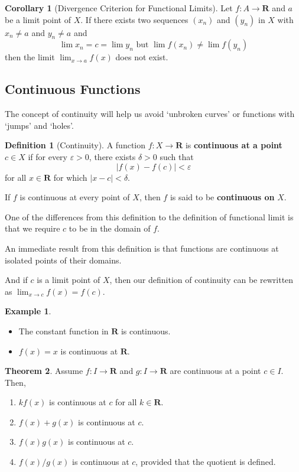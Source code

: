 \documentclass[tikz,12pt,a4paper]{article}
\theoremstyle{definition}
\newtheorem{theorem}{Theorem}[section]
\newtheorem{corollary}[theorem]{Corollary}
\newtheorem{example}{Example}[section]
\newtheorem{definition}{Definition}[section]
\begin{document}
\begin{corollary}[Divergence Criterion for Functional Limits]
	Let $f : A \longrightarrow \textbf{R}$ and $a$ be a limit point of $X$. If there exists two sequences $(x_n)$ and $(y_n)$ in $X$ with $x_n \neq a$ and $y_n \neq a$ and
	\[
		\lim x_n = c = \lim y_n \text{ but } \lim f(x_n) \neq \lim f(y_n)
	\]
	then the limit $ \lim_{x \to a} f(x)$ does not exist.
\end{corollary}

\subsection{Continuous Functions}

The concept of continuity will help us avoid `unbroken curves' or functions with `jumps' and `holes'.

\begin{definition}[Continuity]
	A function $f : X \longrightarrow \textbf{R}$ is \textbf{continuous at a point} $c \in X$ if for every $\varepsilon > 0$, there exists $\delta > 0$ such that
	\[
		| f(x) - f(c) | < \varepsilon
	\]
	for all $x \in \textbf{R}$ for which $| x - c | < \delta$.
	
	If $f$ is continuous at every point of $X$, then $f$ is said to be \textbf{continuous on} $X$.
\end{definition}

One of the differences from this definition to the definition of functional limit is that we require $c$ to be in the domain of $f$.

An immediate result from this definition is that functions are continuous at isolated points of their domains.

And if $c$ is a limit point of $X$, then our definition of continuity can be rewritten as $\lim_{x \to c} f(x) = f(c)$.

\begin{example}
\begin{itemize} \hfill
	\item The constant function in $\textbf{R}$ is continuous.
	\item $f(x) = x$ is continuous at $\textbf{R}$.
\end{itemize}
\end{example}

\begin{theorem}
	Assume $f : I \longrightarrow \textbf{R}$ and $g : I \longrightarrow \textbf{R}$ are continuous at a point $c \in I$. Then,
	
	\begin{enumerate}
		\item $k f(x)$ is continuous at $c$ for all $k \in \textbf{R}$.
		\item $f(x) + g(x)$	is continuous at $c$.
		\item $f(x)g(x)$ is continuous at $c$.
		\item $f(x)/g(x)$ is continuous at $c$, provided that the quotient is defined.
	\end{enumerate}
\end{theorem}
\end{document}
